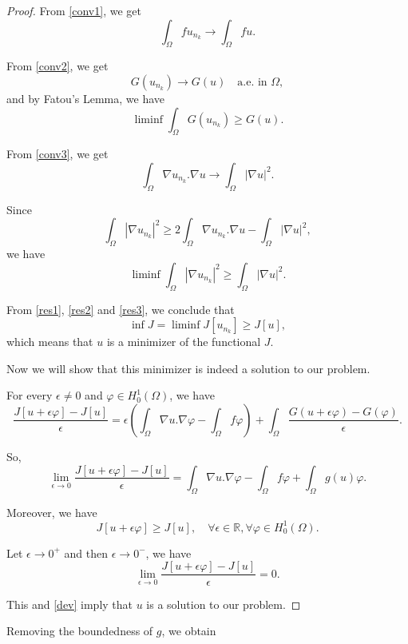 \documentclass[a4paper, 11pt]{report}
\theoremstyle{definition}\newtheorem*{rmk}{Remark}
\begin{document}
\begin{proof}
From \eqref{conv1}, we get
\begin{equation}\label{res1}
\int_{\Omega}fu_{n_k} \to \int_{\Omega}fu .
\end{equation}

From \eqref{conv2}, we get
\[
G(u_{n_k}) \to G(u)\quad \text{a.e.\ in }\Omega,
\]
and by Fatou's Lemma, we have
\begin{equation}\label{res2}
\liminf \int_{\Omega} G(u_{n_k}) \ge G(u).
\end{equation}

From \eqref{conv3}, we get
\[
\int_{\Omega}\nabla u_{n_k}.\nabla u \to \int_{\Omega}|\nabla u|^2  .
\]

Since
\[
\int_{\Omega} |\nabla u_{n_k}|^2 \ge 2\int_{\Omega} \nabla u_{n_k}.\nabla u - \int_{\Omega}|\nabla u|^2,
\]
we have
\begin{equation}\label{res3}
\liminf \int_{\Omega} |\nabla u_{n_k}|^2 \ge \int_{\Omega} |\nabla u|^2 .
\end{equation}

From \eqref{res1}, \eqref{res2} and \eqref{res3}, we conclude that
\[
\inf J = \liminf J[u_{n_k}] \ge J[u],
\]
which means that $u$ is a minimizer of the functional $J$.

Now we will show that this minimizer is indeed a solution to our problem.

For every $\epsilon \neq 0$ and $\varphi \in H^1_0(\Omega)$, we have
\[
\frac{J[u+\epsilon \varphi] - J[u]}{\epsilon} = \epsilon \left(\int_{\Omega}\nabla u . \nabla \varphi - \int_{\Omega} f\varphi \right) + \int_{\Omega}\frac{G(u+\epsilon \varphi) - G(\varphi)}{\epsilon} .
\]

So,
\begin{equation}\label{dev}
\lim_{\epsilon \to 0} \frac{J[u+\epsilon \varphi]-J[u]}{\epsilon} =\int_{\Omega}\nabla u . \nabla \varphi - \int_{\Omega} f\varphi + \int_{\Omega} g(u)\varphi .
\end{equation}

Moreover, we have 
\[
J[u+\epsilon \varphi] \ge J[u],\quad \forall \epsilon \in \mathbb{R},\forall\varphi \in H^1_0{(\Omega)} .
\]
 
Let $\epsilon \to 0^+$ and then $\epsilon \to 0^-$, we have
\[
\lim_{\epsilon \to 0} \frac{J[u+\epsilon \varphi]-J[u]}{\epsilon} = 0 .
\]

This and \eqref{dev} imply that $u$ is a solution to our problem.
\end{proof}

Removing the boundedness of $g$, we obtain
\end{document}

